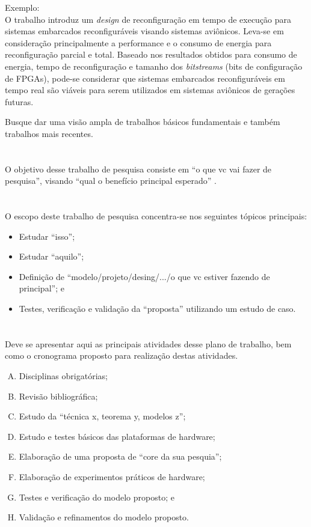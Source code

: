 \documentclass[12pt,a4paper]{article}
\begin{document}
Exemplo:\\%
O trabalho \cite{Loubach2016a} introduz um \textit{design} de reconfiguração em tempo de execução para sistemas embarcados reconfiguráveis visando sistemas aviônicos. Leva-se em consideração principalmente a performance e o consumo de energia para reconfiguração parcial e total. Baseado nos resultados obtidos para consumo de energia, tempo de reconfiguração e tamanho dos \textit{bitstreams} (bits de configuração de FPGAs), pode-se considerar que sistemas embarcados reconfiguráveis em tempo real são viáveis para serem utilizados em sistemas aviônicos de gerações futuras.

Busque dar uma visão ampla de trabalhos básicos fundamentais e também trabalhos mais recentes.


\section{\sectionIII}
\label{sec:objetivo}
O objetivo desse trabalho de pesquisa consiste em ``o que vc vai fazer de pesquisa'', visando ``qual o benefício principal esperado'' .


\section{\sectionIV}
\label{sec:escopo-da-pesquisa}
O escopo deste trabalho de pesquisa concentra-se nos seguintes tópicos principais:

\begin{itemize}
\item Estudar ``isso'';
\item Estudar ``aquilo'';
\item Definição de ``modelo/projeto/desing/.../o que vc estiver fazendo de principal''; e
\item Testes, verificação e validação da ``proposta'' utilizando um estudo de caso.
\end{itemize}


\section{\sectionV}
\label{sec:plano-trabalho-cronograma}
Deve se apresentar aqui as principais atividades desse plano de trabalho, bem como o cronograma proposto para realização destas atividades.

\begin{enumerate}[A.]
  \item Disciplinas obrigatórias;
  \item Revisão bibliográfica;  
  \item Estudo da ``técnica x, teorema y, modelos z'';  
  \item Estudo e testes básicos das plataformas de hardware;  
  \item Elaboração de uma proposta de ``core da sua pesquia'';
  \item Elaboração de experimentos práticos de hardware;  
  \item Testes e verificação do modelo proposto; e    
  \item Validação e refinamentos do modelo proposto.   
\end{enumerate}
\end{document}
